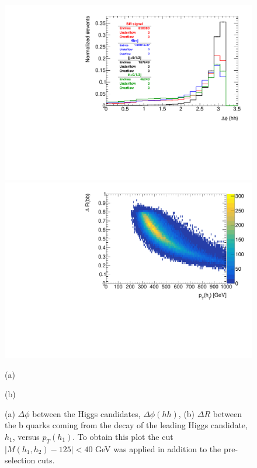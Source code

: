 \begin{figure}
	\centering
	\begin{minipage}{.5\textwidth}
		\centering
		\includegraphics[width=\linewidth]{./Figures/hist_hh_deltaPhi.pdf}
	\end{minipage}%
	\begin{minipage}{.5\textwidth}
		\centering
		\includegraphics[width=\linewidth]{./Figures/hist_deltaR_bb_pt.pdf}
	\end{minipage}
	\begin{minipage}[t]{0.5\textwidth}
		\caption*{(a)}
	\end{minipage}%
	\hfill
	\begin{minipage}[t]{0.5\textwidth}
		\caption*{(b)}
	\end{minipage}
	\caption{(a) $\Delta\phi$ between the Higgs candidates, $\Delta\phi(hh)$, (b) $\Delta R$ between the b quarks coming from the decay of the leading Higgs candidate, $h_1$, versus $p_T(h_1)$. To obtain this plot the cut $|M(h_1,h_2)-125|<40$ GeV was applied in addition to the pre-selection cuts.}
	\label{fig:deltaPhi_deltaR}
\end{figure}

